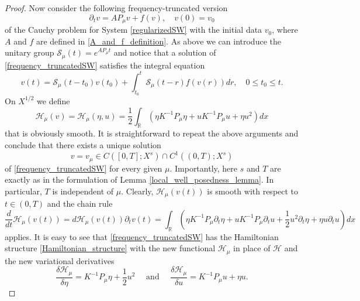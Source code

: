 \documentclass[10pt,a4paper]{amsart}
\newcommand{\R}{\mathbb{R}}
\begin{document}
\begin{proof}
Now consider the following frequency-truncated version
\begin{equation}
\label{frequency_truncatedSW}
    \partial_t v = A P_{\mu} v + f(v)
    , \quad
    v(0) = v_0
\end{equation}
of the Cauchy problem for System \eqref{regularizedSW}
with the initial data $v_0$,
where $A$ and $f$ are defined in \eqref{A_and_f_definition}.
As above we can introduce the unitary group
\(
    \mathcal S_{\mu}(t) = e^{A P_{\mu} t}
\)
and notice that a solution of \eqref{frequency_truncatedSW}
satisfies the integral equation
%
\begin{equation}
\label{frequency_truncated_duhamel}
	v(t)
    =
    \mathcal S_{\mu}(t - t_0) v(t_0)
	+
    \int_{t_0}^t \mathcal S_{\mu}(t - r) f(v(r))
	dr
    , \quad
    0 \leqslant t_0 \leqslant t
	.
\end{equation}
%
On $X^{1/2}$ we define
%
\begin{equation*}
	\mathcal H_{\mu}(v)
    =
	\mathcal H_{\mu}(\eta, u)
    =
    \frac 12 \int_\R
	\left(	
		\eta K^{-1} P_{\mu} \eta
		+
        u K^{-1} P_{\mu} u
		+
        \eta u^2
	\right)
	dx
\end{equation*}
%
that is obviously smooth.
It is straightforward to repeat the above arguments and conclude
that there exists a unique solution
\[
    v = v_{\mu}
    \in
    C   \left( [0, T]; X^s \right)
    \cap
    C^1 \left( (0, T); X^s \right)
\]
of \eqref{frequency_truncatedSW} for every given $\mu$.
Importantly,
here $s$ and $T$ are exactly as in the formulation of Lemma \ref{local_well_posedness_lemma}.
In particular, $T$ is independent of $\mu$.
Clearly,
\(
	\mathcal H_{\mu}(v(t))
\)
is smooth with respect to $t \in (0, T)$ and the chain rule
\[
    \frac d{dt}
	\mathcal H_{\mu}(v(t))
    =
    d \mathcal H_{\mu}(v(t))
    \partial_t v(t)
    =
	\int_\R
	\left(
		\eta K^{-1} P_{\mu} \partial_t \eta
		+
        u K^{-1} P_{\mu} \partial_t u
		+
        \frac 12 u^2 \partial_t \eta
        +
        \eta u \partial_t u
	\right)
	dx
\]
applies.
It is easy to see that \eqref{frequency_truncatedSW} has
the Hamiltonian structure \eqref{Hamiltonian_structure}
with the new functional $\mathcal H_{\mu}$ in place of $\mathcal H$
and the new variational derivatives
\begin{equation*}
    \frac{\delta \mathcal H_{\mu}}{\delta \eta}
    =
    K^{-1} P_{\mu} \eta
	+
    \frac 12 u^2
    \quad
    \text{ and }
    \quad
    \frac{\delta \mathcal H_{\mu}}{\delta u}
    =
    K^{-1} P_{\mu} u
    +
    \eta u
    .
\end{equation*}

\end{proof}
\end{document}
